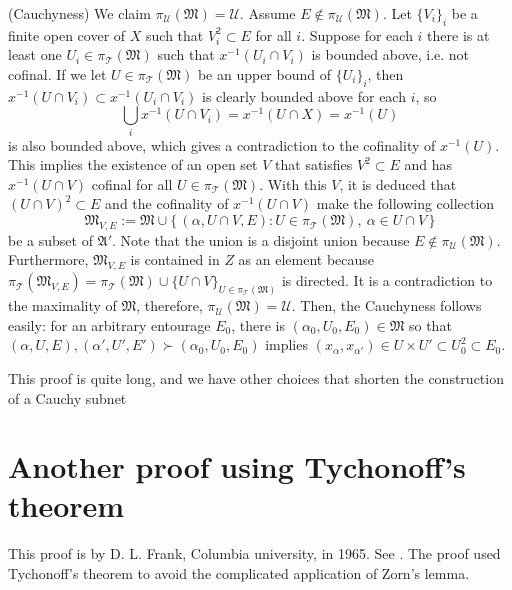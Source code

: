 \documentclass[12pt]{article}
\begin{document}
\begin{pf}[1 of Theorem 1.1]
(Cauchyness)
We claim $\pi_\mathcal{U}(\mathfrak{M})=\mathcal{U}$.
Assume $E\notin\pi_\mathcal{U}(\mathfrak{M})$.
Let $\{V_i\}_i$ be a finite open cover of $X$ such that $V_i^2\subset E$ for all $i$.
Suppose for each $i$ there is at least one $U_i\in\pi_\mathcal{T}(\mathfrak{M})$ such that $x^{-1}(U_i\cap V_i)$ is bounded above, i.e. not cofinal.
If we let $U\in\pi_\mathcal{T}(\mathfrak{M})$ be an upper bound of $\{U_i\}_i$, then $x^{-1}(U\cap V_i)\subset x^{-1}(U_i\cap V_i)$ is clearly bounded above for each $i$, so
\[\bigcup_ix^{-1}(U\cap V_i)=x^{-1}(U\cap X)=x^{-1}(U)\]
is also bounded above, which gives a contradiction to the cofinality of $x^{-1}(U)$.
This implies the existence of an open set $V$ that satisfies $V^2\subset E$ and has $x^{-1}(U\cap V)$ cofinal for all $U\in\pi_\mathcal{T}(\mathfrak{M})$.
With this $V$, it is deduced that $(U\cap V)^2\subset E$ and the cofinality of $x^{-1}(U\cap V)$ make the following collection
\[\mathfrak{M}_{V,E}:=\mathfrak{M}\cup\{\,(\alpha,U\cap V,E):U\in\pi_\mathcal{T}(\mathfrak{M}),\ \alpha\in U\cap V\,\}\]
be a subset of $\mathfrak{A}'$.
Note that the union is a disjoint union because $E\notin\pi_\mathcal{U}(\mathfrak{M})$.
Furthermore, $\mathfrak{M}_{V,E}$ is contained in $Z$ as an element because $\pi_\mathcal{T}(\mathfrak{M}_{V,E})=\pi_\mathcal{T}(\mathfrak{M})\cup\{U\cap V\}_{U\in\pi_\mathcal{T}(\mathfrak{M})}$ is directed.
It is a contradiction to the maximality of $\mathfrak{M}$, therefore, $\pi_\mathcal{U}(\mathfrak{M})=\mathcal{U}$.
Then, the Cauchyness follows easily: for an arbitrary entourage $E_0$, there is $(\alpha_0,U_0,E_0)\in\mathfrak{M}$ so that $(\alpha,U,E),(\alpha',U',E')\succ(\alpha_0,U_0,E_0)$ implies $(x_\alpha,x_{\alpha'})\in U\times U'\subset U_0^2\subset E_0$.
\end{pf}

This proof is quite long, and we have other choices that shorten the construction of a Cauchy subnet






\section{Another proof using Tychonoff's theorem}

This proof is by D. L. Frank, Columbia university, in 1965.
See \cite{frank1965totally}.
The proof used Tychonoff's theorem to avoid the complicated application of Zorn's lemma.
\end{document}
